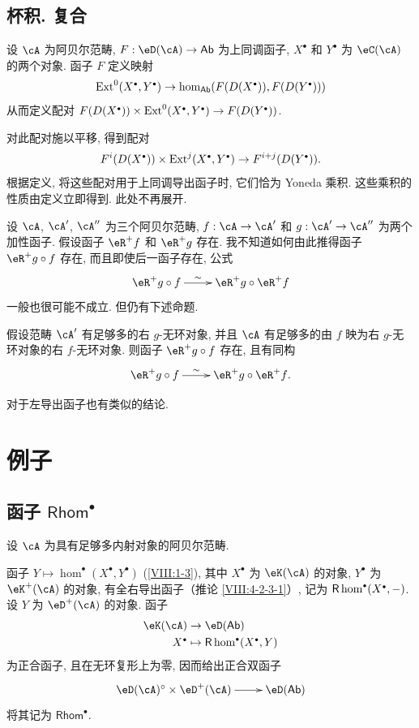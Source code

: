 \subsection{杯积. 复合}\label{VIII:4-3}

设 $\cA$ 为阿贝尔范畴, $F:\eD(\cA) \to \mathsf{Ab}$ 为上同调函子, $X^\bullet$ 和 $Y^\bullet$ 为 $\eC(\cA)$ 的两个对象. 函子 $F$ 定义映射
\[
  \ext^0(X^\bullet,Y^\bullet) \to \hom_{\mathsf{Ab}}(F(D(X^\bullet)),F(D(Y^\bullet)))
\]
从而定义配对
$F(D(X^\bullet))\times \ext^0(X^\bullet,Y^\bullet) \to F(D(Y^\bullet))$.

对此配对施以平移, 得到配对
\[
  F^i(D(X^\bullet))\times \ext^j(X^\bullet,Y^\bullet) \to F^{i+j}(D(Y^\bullet)) \text{.}
\]
根据定义, 将这些配对用于上同调导出函子时, 它们恰为 Yoneda 乘积. 这些乘积的性质由定义立即得到. 此处不再展开.

设 $\cA$, $\cA'$, $\cA''$ 为三个阿贝尔范畴, $f:\cA\to \cA'$ 和 $g:\cA'\to \cA''$ 为两个加性函子. 假设函子 $\eR^+ f$ 和 $\eR^+ g$ 存在. 我不知道如何由此推得函子 $\eR^+ g\circ f$ 存在, 而且即使后一函子存在, 公式
\[\xymatrix{
  \eR^+ g\circ f\ar[r]^-\sim
    & \eR^+ g \circ \eR^+ f
}\]
一般也很可能不成立. 但仍有下述命题.

\begin{proposition}\label{VIII:4-3-1}
假设范畴 $\cA'$ 有足够多的右 $g$-无环对象, 并且 $\cA$ 有足够多的由 $f$ 映为右 $g$-无环对象的右 $f$-无环对象. 则函子 $\eR^+ g\circ f$ 存在, 且有同构
\[\xymatrix{
  \eR^+ g\circ f \ar[r]^-\sim
    & \eR^+ g \circ \eR^+ f \text{.}
}\]
\end{proposition}

对于左导出函子也有类似的结论.

\section{例子}\label{VIII:6} %

\subsection{函子 \texorpdfstring{$\mathsf{Rhom}^\bullet$}{Hom*}}\label{VIII:6-1}

设 $\cA$ 为具有足够多内射对象的阿贝尔范畴.

函子 $Y\mapsto \hom^\bullet(X^\bullet,Y^\bullet)$ (\ref{VIII:1-3}), 其中 $X^\bullet$ 为 $\eK(\cA)$ 的对象, $Y^\bullet$ 为 $\eK^+(\cA)$ 的对象, 有全右导出函子（推论 \ref{VIII:4-2-3-1}）, 记为 $\rhom^\bullet(X^\bullet,-)$. 设 $Y$ 为 $\eD^+(\cA)$ 的对象. 函子
\begin{align*}
  \eK(\cA) &\to \eD(\mathsf{Ab}) \\
  X^\bullet &\mapsto \rhom^\bullet(X^\bullet,Y)
\end{align*}
为正合函子, 且在无环复形上为零, 因而给出正合双函子
\[\xymatrix{
  \eD(\cA)^\circ \times \eD^+(\cA) \ar[r]
    & \eD(\mathsf{Ab})
}\]
将其记为 $\mathsf{Rhom}^\bullet$.

